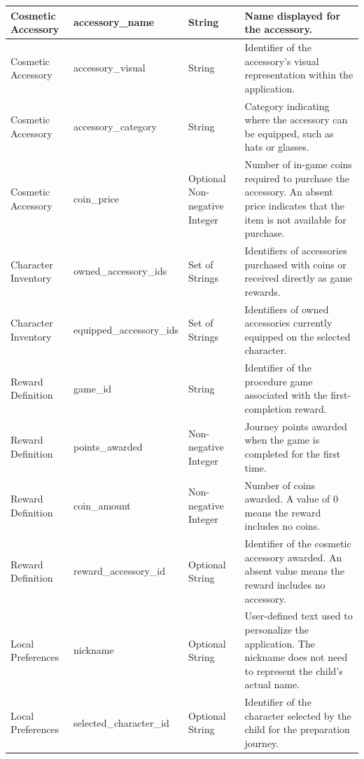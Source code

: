\documentclass[12pt]{article}
\begin{document}
\begin{longtable}{
    p{}
    p{}
    p{}
    p{}
}
Cosmetic Accessory &
accessory\_name &
String &
Name displayed for the accessory. \\
\midrule

Cosmetic Accessory &
accessory\_visual &
String &
Identifier of the accessory's visual representation
within the application. \\
\midrule

Cosmetic Accessory &
accessory\_category &
String &
Category indicating where the accessory can
be equipped, such as hats or glasses. \\
\midrule

Cosmetic Accessory &
coin\_price &
Optional Non-negative Integer &
Number of in-game coins required to purchase
the accessory. An absent price indicates that
the item is not available for purchase. \\
\midrule

Character Inventory &
owned\_accessory\_ids &
Set of Strings &
Identifiers of accessories purchased with coins
or received directly as game rewards. \\
\midrule

Character Inventory &
equipped\_accessory\_ids &
Set of Strings &
Identifiers of owned accessories currently
equipped on the selected character. \\
\midrule

Reward Definition &
game\_id &
String &
Identifier of the procedure game associated
with the first-completion reward. \\
\midrule

Reward Definition &
points\_awarded &
Non-negative Integer &
Journey points awarded when the game is
completed for the first time. \\
\midrule

Reward Definition &
coin\_amount &
Non-negative Integer &
Number of coins awarded. A value of 0 means the
reward includes no coins. \\
\midrule

Reward Definition &
reward\_accessory\_id &
Optional String &
Identifier of the cosmetic accessory awarded. An
absent value means the reward includes no accessory. \\
\midrule

Local Preferences &
nickname &
Optional String &
User-defined text used to personalize the
application. The nickname does not need to
represent the child's actual name. \\
\midrule

Local Preferences &
selected\_character\_id &
Optional String &
Identifier of the character selected by the child
for the preparation journey. \\
\midrule


\end{longtable}
\end{document}
